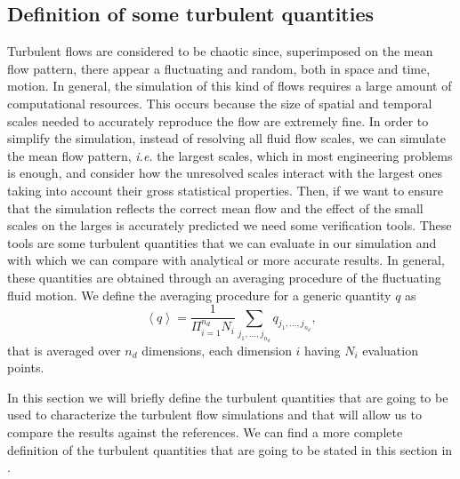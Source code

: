 \subsection{Definition of some turbulent quantities}
Turbulent flows are considered to be chaotic since, superimposed on the mean flow pattern, there appear a fluctuating and random, both in space and time, motion. In general, the simulation of this kind of flows requires a large amount of computational resources. This occurs because the size of spatial and temporal scales needed to accurately reproduce the flow are extremely fine. In order to simplify the simulation, instead of resolving all fluid flow scales, we can simulate the mean flow pattern, \textit{i.e.} the largest scales, which in most engineering problems is enough, and consider how the unresolved scales interact with the largest ones taking into account their gross statistical properties. Then, if we want to ensure that the simulation reflects the correct mean flow and the effect of the small scales on the larges is accurately predicted we need some verification tools. These tools are some turbulent quantities that we can evaluate in our simulation and with which we can compare with analytical or more accurate results. In general, these quantities are obtained through an averaging procedure of the fluctuating fluid motion. We define the averaging procedure for a generic quantity $q$ as
$$\left\langle q\right\rangle=\frac{1}{\Pi_{i=1}^{n_d}N_i}\sum_{j_1,...,j_{n_d}}q_{j_1,...,j_{n_d}},$$
that is averaged over $n_d$ dimensions, each dimension $i$ having $N_i$ evaluation points. 

In this section we will briefly define the turbulent quantities that are going to be used to characterize the turbulent flow simulations and that will allow us to compare the results against the references. We can find a more complete definition of the turbulent quantities that are going to be stated in this section in \cite{orlandi_fluid_2012,pope_turbulent_2000,davidson_turbulence:_2004}.

